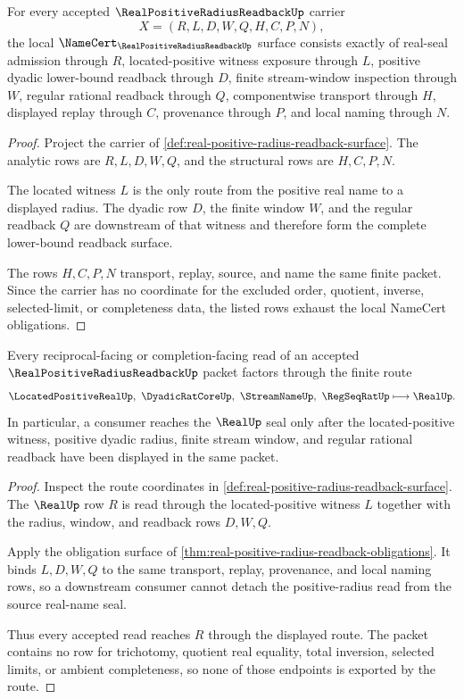\begin{theorem}
\label{thm:real-positive-radius-readback-obligations}
For every accepted $\RealPositiveRadiusReadbackUp$ carrier
$$
X=(R,L,D,W,Q,H,C,P,N),
$$
the local $\NameCert_{\RealPositiveRadiusReadbackUp}$ surface consists exactly of real-seal admission through $R$, located-positive witness exposure through $L$, positive dyadic lower-bound readback through $D$, finite stream-window inspection through $W$, regular rational readback through $Q$, componentwise transport through $H$, displayed replay through $C$, provenance through $P$, and local naming through $N$.
\end{theorem}
\begin{proof}
Project the carrier of \autoref{def:real-positive-radius-readback-surface}. The analytic rows are $R,L,D,W,Q$, and the structural rows are $H,C,P,N$.

The located witness $L$ is the only route from the positive real name to a displayed radius. The dyadic row $D$, the finite window $W$, and the regular readback $Q$ are downstream of that witness and therefore form the complete lower-bound readback surface.

The rows $H,C,P,N$ transport, replay, source, and name the same finite packet. Since the carrier has no coordinate for the excluded order, quotient, inverse, selected-limit, or completeness data, the listed rows exhaust the local NameCert obligations.
\end{proof}

\begin{theorem}
\label{thm:real-positive-radius-readback-route}
Every reciprocal-facing or completion-facing read of an accepted $\RealPositiveRadiusReadbackUp$ packet factors through the finite route
$$
\LocatedPositiveRealUp,\ \DyadicRatCoreUp,\ \StreamNameUp,\ \RegSeqRatUp \longmapsto \RealUp .
$$
In particular, a consumer reaches the $\RealUp$ seal only after the located-positive witness, positive dyadic radius, finite stream window, and regular rational readback have been displayed in the same packet.
\end{theorem}
\begin{proof}
Inspect the route coordinates in \autoref{def:real-positive-radius-readback-surface}. The $\RealUp$ row $R$ is read through the located-positive witness $L$ together with the radius, window, and readback rows $D,W,Q$.

Apply the obligation surface of \autoref{thm:real-positive-radius-readback-obligations}. It binds $L,D,W,Q$ to the same transport, replay, provenance, and local naming rows, so a downstream consumer cannot detach the positive-radius read from the source real-name seal.

Thus every accepted read reaches $R$ through the displayed route. The packet contains no row for trichotomy, quotient real equality, total inversion, selected limits, or ambient completeness, so none of those endpoints is exported by the route.
\end{proof}

